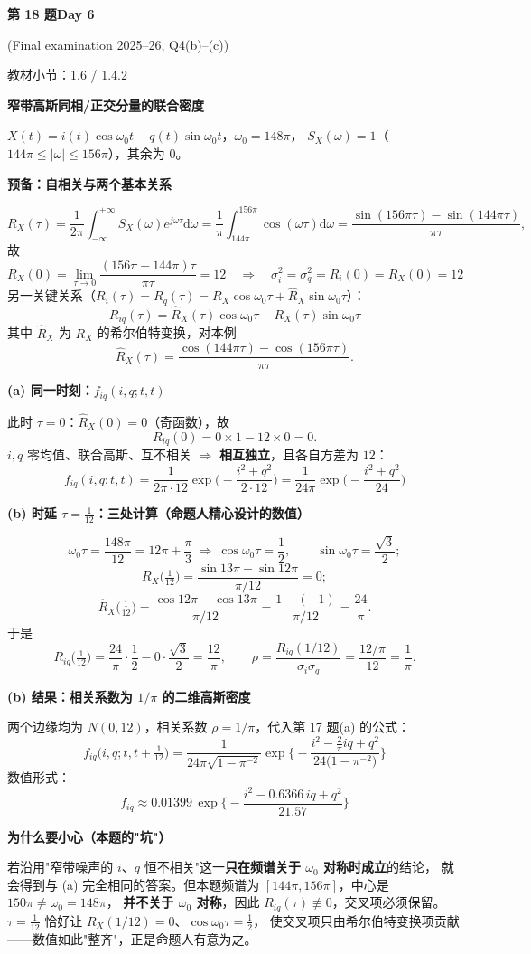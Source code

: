 \documentclass[10.5pt,fontset=fandol]{ctexart}
\newcommand{\key}[1]{\par\vspace{4pt}\noindent\textbf{\color{navy}#1}\par\vspace{2pt}}
\newcommand{\dd}{\mathrm d}\newcommand{\Var}{\operatorname{Var}}\newcommand{\Cov}{\operatorname{Cov}}
\newcommand{\qtitle}[2]{\par\addvspace{1.2em}\Needspace{8\baselineskip}\begin{tcolorbox}[colback=navy,colframe=navy,arc=1.5pt,boxrule=0pt]\color{white}\large\bfseries #1\hfill\small #2\end{tcolorbox}}
\begin{document}
\qtitle{第 18 题}{Day 6}
{\small\color{accentred}(Final examination 2025--26, Q4(b)--(c))}\par\smallskip
{\small\color{muted}教材小节：1.6 / 1.4.2}\par\medskip
\noindent\textbf{窄带高斯同相/正交分量的联合密度}\par\smallskip\begin{tcolorbox}[breakable,colback=qbg,colframe=qbg,boxrule=0pt]$X(t)=i(t)\cos\omega_0t-q(t)\sin\omega_0t$，$\omega_0=148\pi$，
$S_X(\omega)=1$（$144\pi\le|\omega|\le156\pi$），其余为 $0$。

\key{预备：自相关与两个基本关系}
\[
R_X(\tau)=\frac{1}{2\pi}\int_{-\infty}^{+\infty}\!\!S_X(\omega)e^{j\omega\tau}\dd\omega
=\frac{1}{\pi}\int_{144\pi}^{156\pi}\!\!\cos(\omega\tau)\dd\omega
=\frac{\sin(156\pi\tau)-\sin(144\pi\tau)}{\pi\tau},
\]
故
\[
R_X(0)=\lim_{\tau\to0}\frac{(156\pi-144\pi)\tau}{\pi\tau}=12
\quad\Longrightarrow\quad
\boxed{\sigma_i^2=\sigma_q^2=R_i(0)=R_X(0)=12}
\]
另一关键关系（$R_i(\tau)=R_q(\tau)=R_X\cos\omega_0\tau+\hat R_X\sin\omega_0\tau$）：
\[
\boxed{\,R_{iq}(\tau)=\hat R_X(\tau)\cos\omega_0\tau-R_X(\tau)\sin\omega_0\tau\,}
\]
其中 $\hat R_X$ 为 $R_X$ 的希尔伯特变换，对本例
\[
\hat R_X(\tau)=\frac{\cos(144\pi\tau)-\cos(156\pi\tau)}{\pi\tau}.
\]

\key{(a) 同一时刻：$f_{iq}(i,q;t,t)$}
此时 $\tau=0$：$\hat R_X(0)=0$（奇函数），故
\[
R_{iq}(0)=0\times1-12\times0=0 .
\]
$i,q$ 零均值、联合高斯、互不相关 $\Rightarrow$ \textbf{相互独立}，且各自方差为 $12$：
\[
\boxed{\,f_{iq}(i,q;t,t)=\frac{1}{2\pi\cdot12}\exp\!\Big(-\frac{i^2+q^2}{2\cdot12}\Big)
=\frac{1}{24\pi}\exp\!\Big(-\frac{i^2+q^2}{24}\Big)\,}
\]

\key{(b) 时延 $\tau=\tfrac{1}{12}$：三处计算（命题人精心设计的数值）}
\[
\omega_0\tau=\frac{148\pi}{12}=12\pi+\frac{\pi}{3}
\ \Longrightarrow\ \cos\omega_0\tau=\frac12,\qquad \sin\omega_0\tau=\frac{\sqrt3}{2};
\]
\[
R_X\!\Big(\tfrac1{12}\Big)=\frac{\sin 13\pi-\sin 12\pi}{\pi/12}=0 ;
\]
\[
\hat R_X\!\Big(\tfrac1{12}\Big)=\frac{\cos 12\pi-\cos 13\pi}{\pi/12}
=\frac{1-(-1)}{\pi/12}=\frac{24}{\pi}.
\]
于是
\[
R_{iq}\!\Big(\tfrac1{12}\Big)=\frac{24}{\pi}\cdot\frac12-0\cdot\frac{\sqrt3}{2}=\frac{12}{\pi},
\qquad
\rho=\frac{R_{iq}(1/12)}{\sigma_i\sigma_q}=\frac{12/\pi}{12}=\frac1\pi .
\]

\key{(b) 结果：相关系数为 $1/\pi$ 的二维高斯密度}
两个边缘均为 $N(0,12)$，相关系数 $\rho=1/\pi$，代入第 17 题(a) 的公式：
\[
\boxed{\,f_{iq}\!\Big(i,q;t,t+\tfrac1{12}\Big)
=\frac{1}{24\pi\sqrt{1-\pi^{-2}}}\exp\!\Big\{-\frac{i^2-\frac{2}{\pi}iq+q^2}{24\big(1-\pi^{-2}\big)}\Big\}\,}
\]
数值形式：
\[
f_{iq}\approx0.01399\,\exp\!\Big\{-\frac{i^2-0.6366\,iq+q^2}{21.57}\Big\}
\]

\key{为什么要小心（本题的"坑"）}
若沿用"窄带噪声的 $i$、$q$ 恒不相关"这一\textbf{只在频谱关于 $\omega_0$ 对称时成立}的结论，
就会得到与 (a) 完全相同的答案。但本题频谱为 $[144\pi,156\pi]$，中心是 $150\pi\neq\omega_0=148\pi$，
\textbf{并不关于 $\omega_0$ 对称}，因此 $R_{iq}(\tau)\not\equiv0$，交叉项必须保留。
$\tau=\tfrac1{12}$ 恰好让 $R_X(1/12)=0$、$\cos\omega_0\tau=\tfrac12$，
使交叉项只由希尔伯特变换项贡献——数值如此"整齐"，正是命题人有意为之。
\end{tcolorbox}
\end{document}
